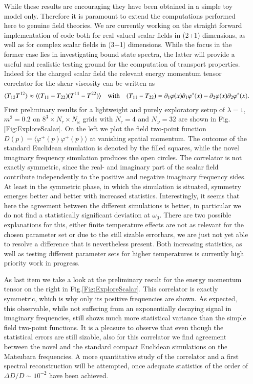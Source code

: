 \documentclass[epj]{webofc}
\begin{document}
While these results are encouraging they have been obtained in a simple toy model only. Therefore it is paramount to extend the computations performed here to genuine field theories. We are currently working on the straight forward implementation of code both for real-valued scalar fields in (2+1) dimensions, as well as for complex scalar fields in (3+1) dimensions. While the focus in the former case lies in investigating bound state spectra, the latter will provide a useful and realistic testing ground for the computation of transport properties. Indeed for the charged scalar field the relevant energy momentum tensor correlator for the shear viscosity \cite{Caracciolo:1988hc} can be written as 
\begin{align}
\langle T_{12}T^{12}\rangle\approx\langle (T_{11}-T_{22}) (T^{11}-T^{22})\rangle \quad {\rm with} \quad
 (T_{11}-T_{22})=\partial_1\varphi(x)\partial_1\varphi^*(x)-\partial_2\varphi(x)\partial_2\varphi^*(x).
\end{align}
First preliminary results for a lightweight and purely exploratory setup of $\lambda=1$, $m^2=0.2$ on $8^3\times N_\tau\times N_\omega$ grids with $N_\tau=4$ and $N_\omega=32$ are shown in Fig.\ref{Fig:ExploreScalar}. On the left we plot the field two-point function $D(p)=\langle \varphi^+(p)\varphi^+(p)\rangle$ at vanishing spatial momentum. The outcome of the standard Euclidean simulation is denoted by the filled squares, while the novel imaginary frequency simulation produces the open circles.  The correlator is not exactly symmetric, since the real- and imaginary part of the scalar field contribute independently to the positive and negative imaginary frequency sides. At least in the symmetric phase, in which the simulation is situated, symmetry emerges better and better with increased statistics. Interestingly, it seems that here the agreement between the different simulations is better, in particular we do not find a statistically significant deviation at $\omega_0$. There are two possible explanations for this, either finite temperature effects are not as relevant for the chosen parameter set or due to the still sizable errorbars, we are just not yet able to resolve a difference that is nevertheless present. Both increasing statistics, as well as testing different parameter sets for higher temperatures is currently high priority work in progress.

As last item we take a look at the preliminary result for the energy momentum tensor on the right in Fig.\ref{Fig:ExploreScalar}. This correlator is exactly symmetric, which is why only its positive frequencies are shown. As expected, this observable, while not suffering from an exponentially decaying signal in imaginary frequencies, still shows much more statistical variance than the simple field two-point functions. It is a pleasure to observe that even though the statistical errors are still sizable, also for this correlator we find agreement between the novel and the standard compact Euclidean simulations on the Matsubara frequencies. A more quantitative study of the correlator and a first spectral reconstruction will be attempted, once adequate statistics of the order of $\Delta D/D\sim10^{-2}$ have been achieved.
\end{document}
